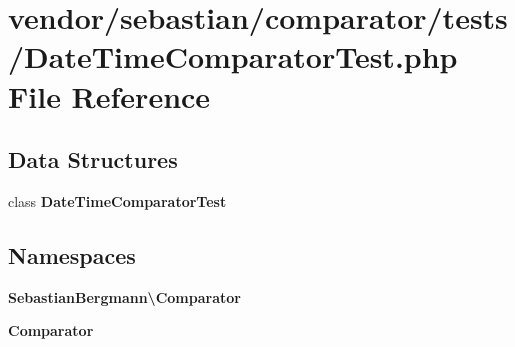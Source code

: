 \section{vendor/sebastian/comparator/tests/\+Date\+Time\+Comparator\+Test.php File Reference}
\label{_date_time_comparator_test_8php}
\subsection*{Data Structures}
\begin{DoxyCompactItemize}
\item 
class {\bf Date\+Time\+Comparator\+Test}
\end{DoxyCompactItemize}
\subsection*{Namespaces}
\begin{DoxyCompactItemize}
\item 
 {\bf Sebastian\+Bergmann\textbackslash{}\+Comparator}
\item 
 {\bf Comparator}
\end{DoxyCompactItemize}
